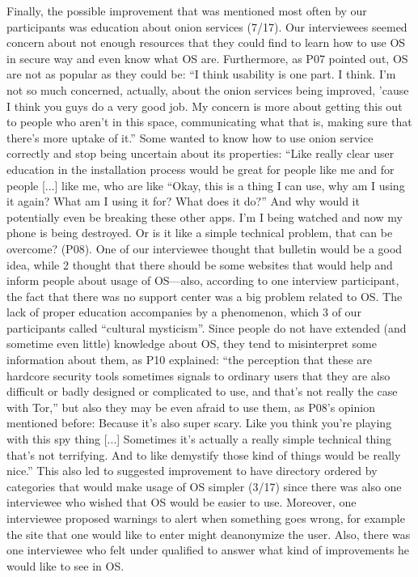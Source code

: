 Finally, the possible improvement that was mentioned most often by our
participants was education about onion services (7/17). Our interviewees seemed
concern about not enough resources that they could find to learn how to use OS
in secure way and even know what OS are. Furthermore, as P07 pointed out, OS are
not as popular as they could be: ``I think usability is one part. I think. I'm
not so much concerned, actually, about the onion services being improved, 'cause
I think you guys do a very good job. My concern is more about getting this out
to people who aren't in this space, communicating what that is, making sure that
there's more uptake of it.'' Some wanted to know how to use onion service
correctly and stop being uncertain about its properties: ``Like really clear
user education in the installation process would be great for people like me and
for people [...] like me, who are like ``Okay, this is a thing I can use, why am
I using it again? What am I using it for? What does it do?'' And why would it
potentially even be breaking these other apps. I'm I being watched and now my
phone is being destroyed. Or is it like a simple technical problem, that can be
overcome? (P08). One of our interviewee thought that bulletin would be a good
idea, while 2 thought that there should be some websites that would help and
inform people about usage of OS---also, according to one interview participant,
the fact that there was no support center was a big problem related to OS.  The
lack of proper education accompanies by a phenomenon, which 3 of our
participants called ``cultural mysticism''. Since people do not have extended
(and sometime even little) knowledge about OS, they tend to misinterpret some
information about them, as P10 explained: ``the perception that these are
hardcore security tools sometimes signals to ordinary users that they are also
difficult or badly designed or complicated to use, and that's not really the
case with Tor,'' but also they may be even afraid to use them, as P08's opinion
mentioned before: Because it's also super scary. Like you think you're playing
with this spy thing [...] Sometimes it's actually a really simple technical
thing that's not terrifying. And to like demystify those kind of things would be
really nice.'' This also led to suggested improvement to have directory ordered
by categories that would make usage of OS simpler (3/17) since there was also
one interviewee who wished that OS would be easier to use. Moreover, one
interviewee proposed warnings to alert when something goes wrong, for example
the site that one would like to enter might deanonymize the user. Also, there
was one interviewee who felt under qualified to answer what kind of improvements
he would like to see in OS.
